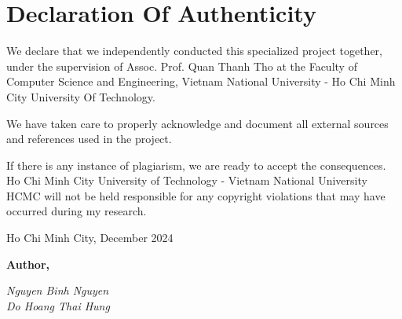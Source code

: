 \newpage

\section*{\Huge Declaration Of Authenticity}

 We declare that we independently conducted this specialized project together, under the supervision of Assoc. Prof. Quan Thanh Tho at the Faculty of Computer Science and Engineering, Vietnam National University - Ho Chi Minh City University Of Technology.

We have taken care to properly acknowledge and document all external sources and references used in the project.

If there is any instance of plagiarism, we are ready to accept the consequences. Ho Chi Minh City University of Technology - Vietnam National University HCMC will not be held responsible for any copyright violations that may have occurred during my research.
\newline

\begin{flushright}
\begin{minipage}[t]{0.48\textwidth}
\begin{center}
    Ho Chi Minh City, December 2024
    
    \textbf{Author,}

    \textit{Nguyen Binh Nguyen}\\
    \textit{Do Hoang Thai Hung}
    \end{center}
\end{minipage}
\end{flushright}
\begin{flushright}
    
\end{flushright}